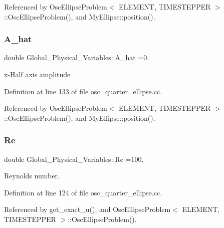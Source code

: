 Referenced by Osc\+Ellipse\+Problem$<$ E\+L\+E\+M\+E\+N\+T, T\+I\+M\+E\+S\+T\+E\+P\+P\+E\+R $>$\+::\+Osc\+Ellipse\+Problem(), and My\+Ellipse\+::position().

\mbox{\label{namespaceGlobal__Physical__Variables_a11d1e77201d6b8c250c4c9396fc5ad06}} 
\subsubsection{\texorpdfstring{A\+\_\+hat}{A\_hat}}
{\footnotesize\ttfamily double Global\+\_\+\+Physical\+\_\+\+Variables\+::\+A\+\_\+hat =0.}



x-\/\+Half axis amplitude 



Definition at line 133 of file osc\+\_\+quarter\+\_\+ellipse.\+cc.



Referenced by Osc\+Ellipse\+Problem$<$ E\+L\+E\+M\+E\+N\+T, T\+I\+M\+E\+S\+T\+E\+P\+P\+E\+R $>$\+::\+Osc\+Ellipse\+Problem(), and My\+Ellipse\+::position().

\mbox{\label{namespaceGlobal__Physical__Variables_ab814e627d2eb5bc50318879d19ab16b9}} 
\subsubsection{\texorpdfstring{Re}{Re}}
{\footnotesize\ttfamily double Global\+\_\+\+Physical\+\_\+\+Variables\+::\+Re =100.}



Reynolds number. 



Definition at line 124 of file osc\+\_\+quarter\+\_\+ellipse.\+cc.



Referenced by get\+\_\+exact\+\_\+u(), and Osc\+Ellipse\+Problem$<$ E\+L\+E\+M\+E\+N\+T, T\+I\+M\+E\+S\+T\+E\+P\+P\+E\+R $>$\+::\+Osc\+Ellipse\+Problem().

